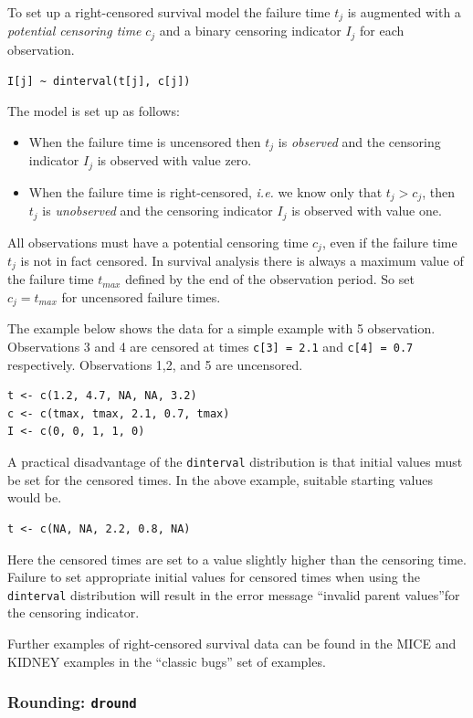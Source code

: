 \documentclass[11pt, a4paper, titlepage]{report}
\begin{document}
To set up a right-censored survival model the failure time $t_j$ is
augmented with a {\em potential censoring time} $c_j$ and a binary
censoring indicator $I_j$ for each observation.
\begin{verbatim}
I[j] ~ dinterval(t[j], c[j])
\end{verbatim}
The model is set up as follows:
\begin{itemize}
\item When the failure time is uncensored then $t_j$ is {\em observed}
  and the censoring indicator $I_j$ is observed with value zero.
\item When the failure time is right-censored, {\em i.e.} we know only
  that $t_j > c_j$, then $t_j$ is {\em unobserved} and the censoring
  indicator $I_j$ is observed with value one.
\end{itemize}
All observations must have a potential censoring time $c_j$, even if
the failure time $t_j$ is not in fact censored.  In survival analysis
there is always a maximum value of the failure time $t_{max}$ defined
by the end of the observation period. So set $c_j = t_{max}$ for
uncensored failure times.

The example below shows the data for a simple example with 5 observation.
Observations 3 and 4 are censored at times \verb+c[3] = 2.1+ and
\verb+c[4] = 0.7+ respectively. Observations 1,2, and 5 are uncensored.
\begin{verbatim}
t <- c(1.2, 4.7, NA, NA, 3.2)
c <- c(tmax, tmax, 2.1, 0.7, tmax)
I <- c(0, 0, 1, 1, 0)
\end{verbatim}
A practical disadvantage of the \texttt{dinterval} distribution is that
initial values must be set for the censored times. In the above example,
suitable starting values would be. %
\begin{verbatim}
t <- c(NA, NA, 2.2, 0.8, NA)
\end{verbatim}
Here the censored times are set to a value slightly higher than the
censoring time. Failure to set appropriate initial values for censored
times when using the \texttt{dinterval} distribution will result in
the error message ``invalid parent values''for the censoring
indicator.

Further examples of right-censored survival data can be found in the
MICE and KIDNEY examples in the ``classic bugs'' set of examples.

\subsubsection{Rounding: \texttt{dround}}
\end{document}
